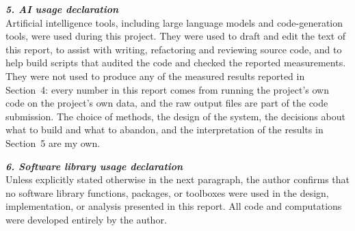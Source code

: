 \textbf{\textit{5. AI usage declaration}}
\\[2ex]
Artificial intelligence tools, including large language models and code-generation tools, were used
during this project. They were used to draft and edit the text of this report, to assist with
writing, refactoring and reviewing source code, and to help build scripts that audited the code and
checked the reported measurements. They were not used to produce any of the measured results
reported in Section~4: every number in this report comes from running the project's own code on the
project's own data, and the raw output files are part of the code submission. The choice of methods,
the design of the system, the decisions about what to build and what to abandon, and the
interpretation of the results in Section~5 are my own.


\textbf{\textit{6. Software library usage declaration}}
\\[2ex]
Unless explicitly stated otherwise in the next paragraph, the author confirms that no software library functions, packages, or toolboxes were used in the design, implementation, or analysis presented in this report. All code and computations were developed entirely by the author.

